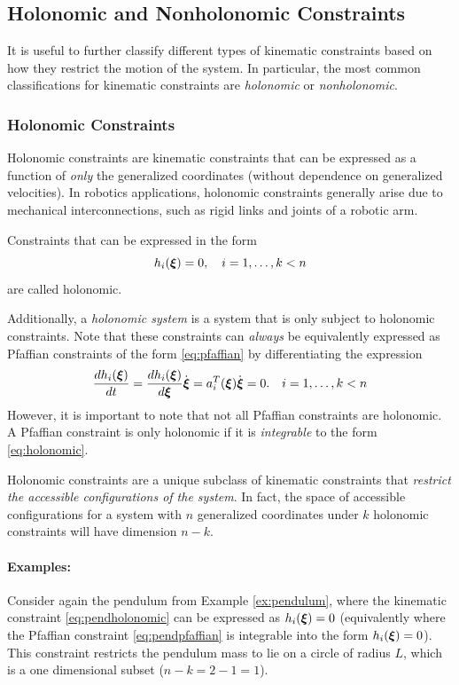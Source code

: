 \subsection{Holonomic and Nonholonomic Constraints}
It is useful to further classify different types of kinematic constraints based on how they restrict the motion of the system. In particular, the most common classifications for kinematic constraints are \textit{holonomic} or \textit{nonholonomic}.

\subsubsection{Holonomic Constraints}
Holonomic constraints are kinematic constraints that can be expressed as a function of \textit{only} the generalized coordinates (without dependence on generalized velocities).
In robotics applications, holonomic constraints generally arise due to mechanical interconnections, such as rigid links and joints of a robotic arm.

\begin{definition} 
Constraints that can be expressed in the form 
\begin{equation}
    h_i(\bm{\xi}) = 0, \quad i = 1, \dots, k < n
    \label{eq:holonomic}
\end{equation}
are called holonomic.
\end{definition}
Additionally, a \textit{holonomic system} is a system that is only subject to holonomic constraints.
Note that these constraints can \textit{always} be equivalently expressed as Pfaffian constraints of the form \eqref{eq:pfaffian} by differentiating the expression
\begin{equation}
\frac{dh_i(\bm{\xi})}{dt} = \frac{dh_i(\bm{\xi})}{d\bm{\xi}}\dot{\bm{\xi}} = a_i^T(\bm{\xi}) \dot{\bm{\xi}} = 0. \quad i = 1, \dots, k < n
\end{equation}
However, it is important to note that not all Pfaffian constraints are holonomic. A Pfaffian constraint is only holonomic if it is \textit{integrable} to the form \eqref{eq:holonomic}.

Holonomic constraints are a unique subclass of kinematic constraints that \textit{restrict the accessible configurations of the system}. In fact, the space of accessible configurations for a system with $n$ generalized coordinates under $k$ holonomic constraints will have dimension $n-k$.

\paragraph{Examples:}
Consider again the pendulum from Example \ref{ex:pendulum}, where the kinematic constraint \eqref{eq:pendholonomic} can be expressed as $h_i(\bm{\xi}) = 0$ (equivalently where the Pfaffian constraint \eqref{eq:pendpfaffian} is integrable into the form $h_i(\bm{\xi}) = 0$). This constraint restricts the pendulum mass to lie on a circle of radius $L$, which is a one dimensional subset ($n-k = 2-1 = 1$). 

